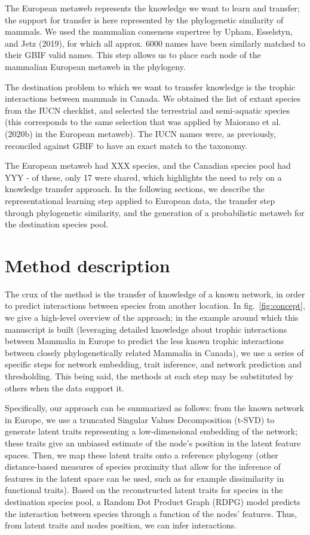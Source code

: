 \documentclass[11pt]{article}
\begin{document}
The European metaweb represents the knowledge we want to learn and
transfer; the support for transfer is here represented by the
phylogenetic similarity of mammals. We used the mammalian consensus
supertree by Upham, Esselstyn, and Jetz (2019), for which all approx.
6000 names have been similarly matched to their GBIF valid names. This
step allows us to place each node of the mammalian European metaweb in
the phylogeny.

The destination problem to which we want to transfer knowledge is the
trophic interactions between mammals in Canada. We obtained the list of
extant species from the IUCN checklist, and selected the terrestrial and
semi-aquatic species (this corresponds to the same selection that was
applied by Maiorano et al. (2020b) in the European metaweb). The IUCN
names were, as previously, reconciled against GBIF to have an exact
match to the taxonomy.

The European metaweb had XXX species, and the Canadian species pool had
YYY - of these, only 17 were shared, which highlights the need to rely
on a knowledge transfer approach. In the following sections, we describe
the representational learning step applied to European data, the
transfer step through phylogenetic similarity, and the generation of a
probabilistic metaweb for the destination species pool.

\hypertarget{method-description}{%
\section{Method description}\label{method-description}}

The crux of the method is the transfer of knowledge of a known network,
in order to predict interactions between species from another location.
In fig.~\ref{fig:concept}, we give a high-level overview of the
approach; in the example around which this manuscript is built
(leveraging detailed knowledge about trophic interactions between
Mammalia in Europe to predict the less known trophic interactions
between closely phylogenetically related Mammalia in Canada), we use a
series of specific steps for network embedding, trait inference, and
network prediction and thresholding. This being said, the methods at
each step may be substituted by others when the data support it.

Specifically, our approach can be summarized as follows: from the known
network in Europe, we use a truncated Singular Values Decomposition
(t-SVD) to generate latent traits representing a low-dimensional
embedding of the network; these traits give an unbiased estimate of the
node's position in the latent feature spaces. Then, we map these latent
traits onto a reference phylogeny (other distance-based measures of
species proximity that allow for the inference of features in the latent
space can be used, such as for example dissimilarity in functional
traits). Based on the reconstructed latent traits for species in the
destination species pool, a Random Dot Product Graph (RDPG) model
predicts the interaction between species through a function of the
nodes' features. Thus, from latent traits and nodes position, we can
infer interactions.
\end{document}

